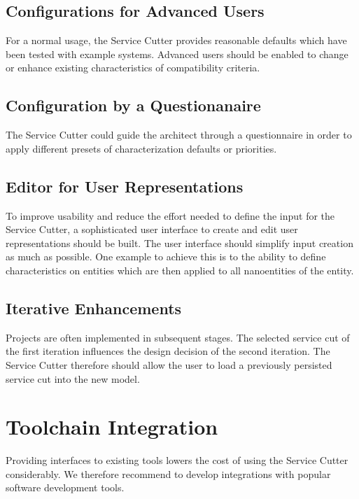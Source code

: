 \subsection{Configurations for Advanced Users}

For a normal usage, the Service Cutter provides reasonable defaults which have been tested with example systems. Advanced users should be enabled to change or enhance existing characteristics of compatibility criteria.

\subsection{Configuration by a Questionanaire}

The Service Cutter could guide the architect through a questionnaire in order to apply different presets of characterization defaults or priorities.

\subsection{Editor for User Representations}

To improve usability and reduce the effort needed to define the input for the Service Cutter, a sophisticated user interface to create and edit user representations should be built. The user interface should simplify input creation as much as possible. One example to achieve this is to the ability to define characteristics on entities which are then applied to all nanoentities of the entity. 

\subsection{Iterative Enhancements}
Projects are often implemented in subsequent stages. The selected service cut of the first iteration influences the design decision of the second iteration. The Service Cutter therefore should allow the user to load a previously persisted service cut into the new model.

\section{Toolchain Integration}

Providing interfaces to existing tools lowers the cost of using the Service Cutter considerably. We therefore recommend to develop integrations with popular software development tools.

